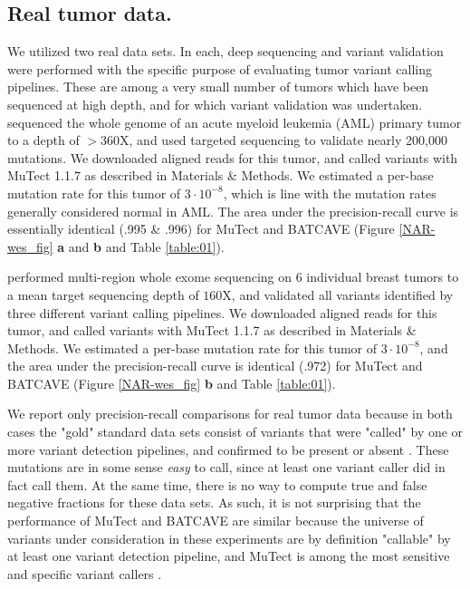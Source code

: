 \documentclass[a4,center,fleqn]{NAR}
\newcommand{\batcave}{BATCAVE }
\begin{document}
\subsection{Real tumor data.}
We utilized two real data sets.
In each, deep sequencing and variant validation were performed with the specific purpose of evaluating tumor variant calling pipelines.
These are among a very small number of tumors which have been sequenced at high depth, and for which variant validation was undertaken.
\citet{Griffith2015} sequenced the whole genome of an acute myeloid leukemia (AML) primary tumor to a depth of $>360\mathrm{X}$, and used targeted sequencing to validate nearly 200,000 mutations.
We downloaded aligned reads for this tumor, and called variants with MuTect 1.1.7 as described in Materials \& Methods.
We estimated a per-base mutation rate for this tumor of $3\cdot10^{-8}$, which is line with the mutation rates generally considered normal in AML.
The area under the precision-recall curve is essentially identical (.995 \& .996) for MuTect and \batcave (Figure \ref{NAR-wes_fig} \textbf{a} and \textbf{b} and Table \ref{table:01}).

\citet{Shi2018} performed multi-region whole exome sequencing on 6 individual breast tumors to a mean target sequencing depth of $160\mathrm{X}$, and validated all variants identified by three different variant calling pipelines.
We downloaded aligned reads for this tumor, and called variants with MuTect 1.1.7 as described in Materials \& Methods.
We estimated a per-base mutation rate for this tumor of $3\cdot10^{-8}$, and the area under the precision-recall curve is identical (.972) for MuTect and \batcave (Figure \ref{NAR-wes_fig} \textbf{b} and Table \ref{table:01}).

We report only precision-recall comparisons for real tumor data because in both cases the "gold" standard data sets consist of variants that were "called" by one or more variant detection pipelines, and confirmed to be present or absent \cite{Griffith2015,Shi2018}.
These mutations are in some sense \textit{easy} to call, since at least one variant caller did in fact call them.
At the same time, there is no way to compute true and false negative fractions for these data sets.
As such, it is not surprising that the performance of MuTect and \batcave are similar because the universe of variants under consideration in these experiments are by definition "callable" by at least one variant detection pipeline, and MuTect is among the most sensitive and specific variant callers \cite{Griffith2015,Cibulskis2013}.
\end{document}
